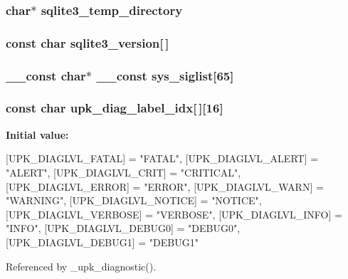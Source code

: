 \subsubsection[{sqlite3\_\-temp\_\-directory}]{\setlength{\rightskip}{0pt plus 5cm}char$\ast$ {\bf sqlite3\_\-temp\_\-directory}}\label{controller_2tp_8c_ada2f9f790df64f7ae8bc2b898b183be2}
\subsubsection[{sqlite3\_\-version}]{\setlength{\rightskip}{0pt plus 5cm}const char {\bf sqlite3\_\-version}[$\,$]}\label{controller_2tp_8c_a466e673c61615dd237c6917c2f95de44}
\subsubsection[{sys\_\-siglist}]{\setlength{\rightskip}{0pt plus 5cm}\_\-\_\-const char$\ast$ \_\-\_\-const {\bf sys\_\-siglist}[65]}\label{controller_2tp_8c_ab00bf959879fed652b40f0468b348f87}
\subsubsection[{upk\_\-diag\_\-label\_\-idx}]{\setlength{\rightskip}{0pt plus 5cm}const char {\bf upk\_\-diag\_\-label\_\-idx}[$\,$][16]\hspace{0.3cm}{\ttfamily  [static]}}\label{controller_2tp_8c_ae422812b612ba3ecf5f411f023416c38}
{\bfseries Initial value:}
\begin{DoxyCode}
 {
    [UPK_DIAGLVL_FATAL] = "FATAL",
    [UPK_DIAGLVL_ALERT] = "ALERT",
    [UPK_DIAGLVL_CRIT] = "CRITICAL",
    [UPK_DIAGLVL_ERROR] = "ERROR",
    [UPK_DIAGLVL_WARN] = "WARNING",
    [UPK_DIAGLVL_NOTICE] = "NOTICE",
    [UPK_DIAGLVL_VERBOSE] = "VERBOSE",
    [UPK_DIAGLVL_INFO] = "INFO",
    [UPK_DIAGLVL_DEBUG0] = "DEBUG0",
    [UPK_DIAGLVL_DEBUG1] = "DEBUG1"
}
\end{DoxyCode}


Referenced by \_\-upk\_\-diagnostic().

